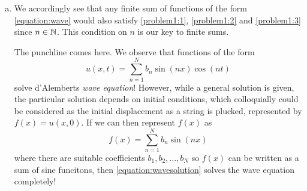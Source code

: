 \begin{problem}
\begin{enumerate}[(a)]
\begin{proof}
                \begin{align}
                \label{align:dt}
                D_{t} u(x,t) &= -b_n n \sin(nx) \sin(nt) \\
                D_{tt} u(x,t) &= -b_n n^2 \sin(nx) \cos(nt)
                \end{align}

                We see that $D_{xx} = D_{tt}$.

                (2) We now observe $u(0,t)$ and $u(\pi,t)$.
                \begin{equation}
                    u(0,t) = b_n \sin(n0) \cos(nt) = 0
                \end{equation}
                \begin{equation}
                \label{equation:sinpi}
                    u(\pi,t) = b_n \sin(n \pi) \cos(nt) = 0
                \end{equation}

                (3) We computed $u_t$ previously in \cref{align:dt}. It follows that 
                \begin{equation}
                    u_t(x,0) = -b_n n \sin(nx) \sin(n0) = 0.
                \end{equation}
                
            \end{proof}
            We see that $n\in\N$ is a necessary condition for these equations, particularly in \cref{equation:sinpi}, in order to ensure that $\sin(n\pi)=0$ Some $n\not\in\N$ results in a non-zero value of $\sin(n\pi)$

            \item We accordingly see that any finite sum of functions of the form \cref{equation:wave} would also satisfy \cref{problem1:1}, \cref{problem1:2} and \cref{problem1:3} since $n \in \N$. This condition on $n$ is our key to finite sums.

            The punchline comes here. We observe that functions of the form 
            \begin{equation}
            \label{equation:wavesolution}
                u(x,t) = \sum_{n=1}^{N}b_n \sin(nx) \cos(nt)
            \end{equation}
            solve d'Alemberts \textit{wave equation}!
            However, while a general solution is given, the particular solution depends on initial conditions, which colloquially could be considered as the initial displacement as a string is plucked, represented by $f(x) = u(x,0)$. If we can then represent $f(x)$ as 
            \begin{equation}
                f(x) = \sum_{n=1}^{N} b_n \sin(nx)
            \end{equation}
            where there are suitable coefficients $b_1,b_2,...,b_N$ so $f(x)$ can be written as a sum of sine funcitons, then \cref{equation:wavesolution} solves the wave equation completely!


\end{enumerate}
\end{problem}
